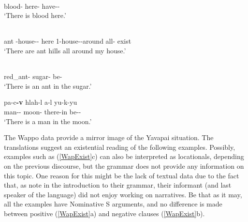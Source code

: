 \begin{exe}\ex{}
\begin{xlist} 
\ex\gll{}  \\
blood-\nom{} here-\loc{} have-\appl{}-\faff{}\\
\glt `There is blood here.' %

\ex\gll{}     \\
ant \poss{}-house-\pl{}-\nom{} here 1-house-\dem{}-around all-\tns{} exist\\
\glt `There are ant hills all around my house.'

\ex\gll{}  \\
red\_ant-\nom{} sugar-\loc{} be-\faff{}\\
\glt `There is an ant in the sugar.'
\end{xlist}
\end{exe}


\begin{exe}\ex\label{HavEx}
\gll pa-c\textbf{-v} hlah-l \texttheta a-l yu-k-yu\\
man-\dem{}-\nom{} moon-\loc{} there-in be-\ind{}-\aux{}\\
\glt `There is a man in the moon.' \end{exe}

The Wappo data provide a mirror image of the Yavapai situation. 
The translations suggest an existential reading of the following examples.
Possibly, examples such as (\ref{WapExist}c) can also be interpreted as locationals, depending on the previous discourse, but the grammar does not provide any information on this topic.
One reason for this might be the lack of textual data due to the fact that, as \citet{Thompsonetal:2006} note in the introduction to their grammar, their informant (and last speaker of the language) did not enjoy working on narratives. 
Be that as it may, all the examples have Nominative S arguments, and no difference is made between positive (\ref{WapExist}a) and negative clauses (\ref{WapExist}b).

